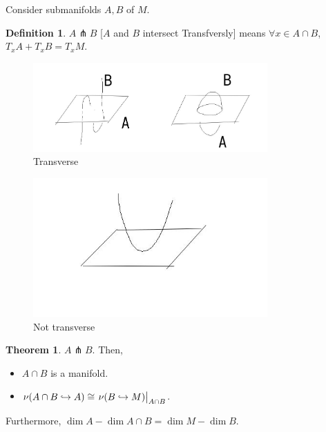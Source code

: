 \documentclass{article}
\theoremstyle{definition}
\newtheorem*{definition}{Definition}
\newtheorem{theorem}{Theorem}
\begin{document}
    Consider submanifolds \(A, B\) of \(M\).

    \begin{definition}
        \(A \pitchfork B\) [\(A\) and \(B\) intersect Transfversly] means \(\forall x\in A \cap B\), \(T_x A + T_x B = T_x M\). 
    \end{definition}

    \begin{figure}[H]
        \centering
        \includegraphics[width=0.8\textwidth]{img/transverse_example}
        \caption{Transverse}
    \end{figure}

    \begin{figure}[H]
        \centering
        \includegraphics[width=0.8\textwidth]{img/not_transverse}
        \caption{Not transverse}
    \end{figure}

    \begin{theorem}
        \(A \pitchfork B\). Then,

        \begin{itemize}
            \item \(A \cap B\) is a manifold.
            \item \(\nu (A \cap B \hookrightarrow A) \cong \eval{\nu(B \hookrightarrow M)}_{A\cap B}\). 
        \end{itemize}
        
        Furthermore, \(\dim A - \dim A \cap B = \dim M - \dim B\).
    \end{theorem}
\end{document}

